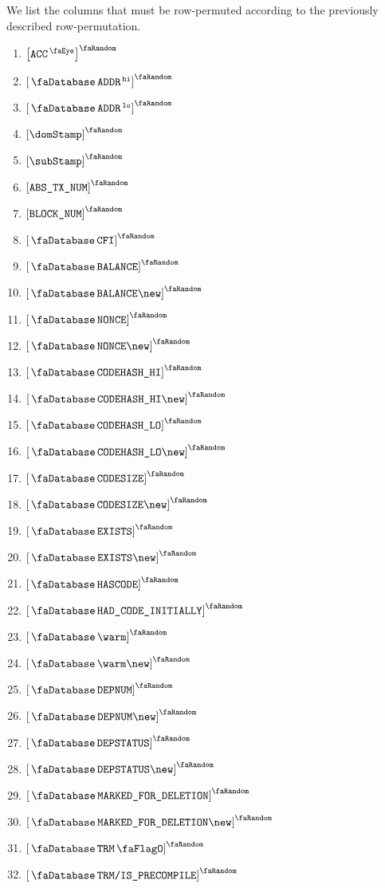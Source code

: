 We list the columns that must be row-permuted according to the previously described row-permutation.
\begin{multicols}{3}
	\begin{enumerate}
		\item $\order{\peekAccount}$
		\item $\order{\accAddress\high}$
		\item $\order{\accAddress\low}$
		\item $\order{\domStamp}$
		\item $\order{\subStamp}$
		\item $\order{\absTxNum}$
		\item $\order{\relBlockNum}$
		\item $\order{\accCfi}$
		\item $\order{\accBalance}$
		\item $\order{\accBalance\new}$
		\item $\order{\accNonce}$
		\item $\order{\accNonce\new}$
		\item $\order{\accCodehashHi}$
		\item $\order{\accCodehashHi\new}$
		\item $\order{\accCodehashLo}$
		\item $\order{\accCodehashLo\new}$
		\item $\order{\accCodesize}$
		\item $\order{\accCodesize\new}$
		\item $\order{\accExists}$
		\item $\order{\accExists\new}$
		\item $\order{\accHasCode}$
		\item $\order{\accHadCodeInitially}$
		\item $\order{\accWarmth}$
		\item $\order{\accWarmth\new}$
		\item $\order{\accDeploymentNumber}$
		\item $\order{\accDeploymentNumber\new}$
		\item $\order{\accDeploymentStatus}$
		\item $\order{\accDeploymentStatus\new}$
		\item $\order{\accMarkedForDeletion}$
		\item $\order{\accMarkedForDeletion\new}$
		\item $\order{\accTrmFlag}$
		\item $\order{\accTrmIsPrecompile}$
	\end{enumerate}
\end{multicols}
